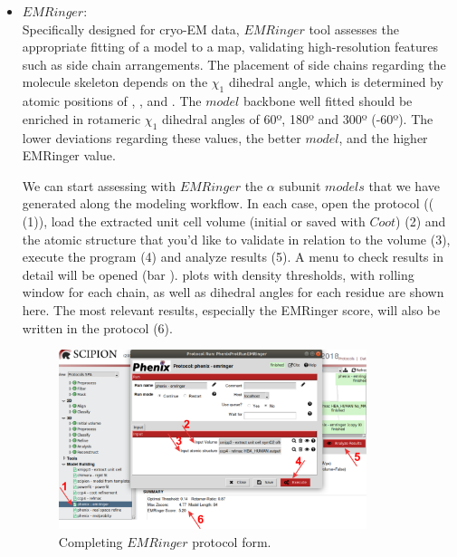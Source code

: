 \begin{itemize}

 \item $EMRinger$:\\
 
 Specifically designed for cryo-EM data, $EMRinger$ tool assesses the appropriate fitting of a model to a map, validating high-resolution features such as side chain arrangements. The placement of side chains regarding the molecule skeleton depends on the $\chi_{1}$ dihedral angle, which is determined by atomic positions of , ,  and . The $model$ backbone well fitted should be enriched in rotameric $\chi_{1}$ dihedral angles of 60º, 180º and 300º (-60º). The lower deviations regarding these values, the better $model$, and the higher EMRinger value.  
 
 We can start assessing with $EMRinger$ the  $\alpha$ subunit $models$ that we have generated along the modeling workflow. In each case, open the  protocol (( (1)), load the extracted unit cell volume (initial or saved with $Coot$) (2) and the atomic structure that you'd like to validate in relation to the volume (3), execute the program (4) and analyze results (5). A menu to check results in detail will be opened (bar ).  plots with density thresholds, with rolling window for each chain, as well as dihedral angles for each residue are shown here. The most relevant results, especially the EMRinger score, will also be written in the protocol  (6). 
 
  \begin{figure}[H]
  \centering 
  \captionsetup{width=.7\linewidth} 
  \includegraphics[width=0.85\textwidth]{Images/Fig34.png}
  \caption{Completing $EMRinger$ protocol form.}
  \label{fig:emringer_protocol}
  \end{figure}
 

\end{itemize}

